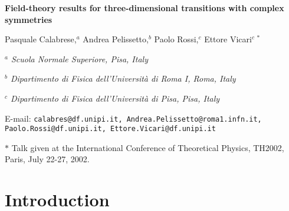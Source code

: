 \documentclass[a4paper,12pt]{article}
\begin{document}
\begin{titlepage}
\begin{center}
{\Large\bf Field-theory results for three-dimensional transitions with complex symmetries}
\end{center}
\vskip 1.3cm
\centerline{
Pasquale Calabrese,$^a$ 
Andrea Pelissetto,$^b$ 
Paolo Rossi,$^c$ 
Ettore Vicari$^{c\;*}$}

\vskip 0.4cm
\centerline{\sl  $^a$ Scuola Normale Superiore, Pisa, Italy} 
\centerline{\sl  $^b$ Dipartimento di Fisica dell'Universit\`a di Roma I,
                       Roma, Italy}
\centerline{\sl  $^c$ Dipartimento di Fisica dell'Universit\`a di Pisa,
                       Pisa, Italy}

\vskip 0.4cm
\begin{center}
E-mail: {\tt calabres@df.unipi.it, Andrea.Pelissetto@roma1.infn.it,} \\

{\tt Paolo.Rossi@df.unipi.it, Ettore.Vicari@df.unipi.it}
\end{center}


\begin{abstract}
We discuss several examples of three-dimensional critical phenomena
that can be described by Landau-Ginzburg-Wilson $\phi^4$ theories.
We present an overview of field-theoretical results
obtained from the analysis of high-order perturbative
series in the frameworks of the $\epsilon$ and of the fixed-dimension $d=3$
expansions.  In particular, we discuss 
the stability of the O($N$)-symmetric fixed
point in a generic $N$-component theory,
the critical behaviors of randomly dilute Ising-like systems
and frustrated spin systems with noncollinear order,
the multicritical behavior arising from the competition
of two distinct types of ordering with symmetry O($n_1$) and O($n_2$) 
respectively. 

\end{abstract}


\noindent
$*$
Talk given at the International Conference of Theoretical Physics, TH2002, 
Paris, July 22-27, 2002.

\end{titlepage}

\section{Introduction}
\label{lsec-intro}
\end{document}
